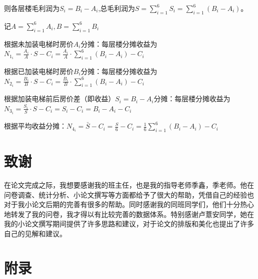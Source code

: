 \documentclass[lang=cn,a4paper]{elegantpaper}
\begin{document}
    则各层楼毛利润为$S_i=B_i-A_i$,总毛利润为$\displaystyle S=\sum_{i=1}^{6}S_i=\sum_{i=1}^{6}(B_i-A_i)$。

    记$\displaystyle A=\sum_{i=1}^6A_i,B=\sum_{i=1}^6B_i$

    根据未加装电梯时房价$A_i$分摊：每层楼分摊收益为$\displaystyle N_{1_i}=\frac{A_i}{A}\cdot S-C_i=\frac{A_i}{A}\cdot\sum_{i=1}^{6}(B_i-A_i)-C_i$

    根据已加装电梯时房价$B_i$分摊：每层楼分摊收益为$\displaystyle N_{2_i}=\frac{B_i}{B}\cdot S-C_i=\frac{B_i}{B}\cdot\sum_{i=1}^{6}(B_i-A_i)-C_i$

    根据加装电梯前后房价差（即收益）$S_i=B_i-A_i$分摊：每层楼分摊收益为$\displaystyle N_{3_i}=\frac{S_i}{S}\cdot S-C_i=S_i-C_i=B_i-A_i-C_i$

    根据平均收益分摊：$\displaystyle N_{4_i}=\bar{S}-C_i=\frac{S}{6}-C_i=\frac{1}{6}\sum_{i=1}^{6}(B_i-A_i)-C_i$
    \section*{致谢}
    在论文完成之际，我想要感谢我的班主任，也是我的指导老师季鑫，季老师。他在问卷调查、统计分析、小论文撰写等方面都给予了很大的帮助，凭借自己的经验也对于我小论文后期的完善有很多的帮助。同时感谢我的同班同学们，他们十分热心地转发了我的问卷，我才得以有比较完善的数据体系。特别感谢卢薏安同学，她在我的小论文撰写期间提供了许多思路和建议，对于论文的排版和美化也提出了许多自己的见解和建议。
    
    \clearpage

    
    
    \clearpage
    
    \section*{附录}
    \appendix
\end{document}
